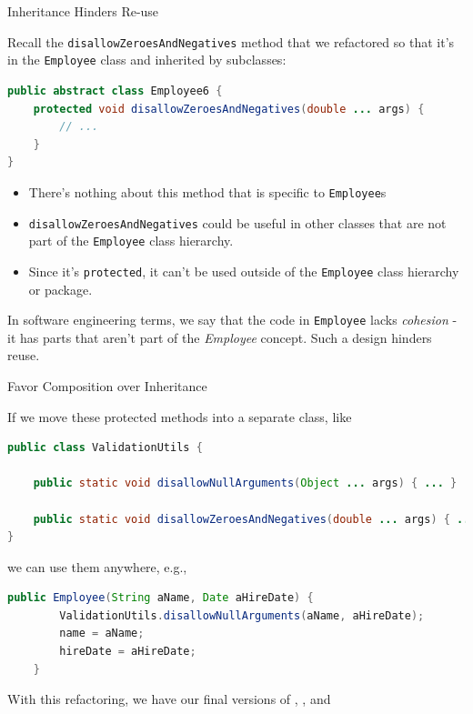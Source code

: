 \documentclass{beamer}
\begin{document}
\begin{frame}[fragile]{Inheritance Hinders Re-use}

Recall the {\tt disallowZeroesAndNegatives} method that we refactored so that it's in the {\tt Employee} class and inherited by subclasses:
\vspace{-.05in}
\begin{lstlisting}[language=Java]
public abstract class Employee6 {
    protected void disallowZeroesAndNegatives(double ... args) {
        // ...
    }
}
\end{lstlisting}

\begin{itemize}
\item There's nothing about this method that is specific to {\tt Employee}s
\item {\tt disallowZeroesAndNegatives} could be useful in other classes that are not part of the {\tt Employee} class hierarchy.
\item Since it's {\tt protected}, it can't be used outside of the {\tt Employee} class hierarchy or package. 
\end{itemize}

In software engineering terms, we say that the code in {\tt Employee} lacks {\it cohesion} - it has parts that aren't part of the {\it Employee} concept.  Such a design hinders reuse.

\end{frame}

\begin{frame}[fragile]{Favor Composition over Inheritance}

If we move these protected methods into a separate class, like 
\begin{lstlisting}[language=Java]
public class ValidationUtils {

    public static void disallowNullArguments(Object ... args) { ... }

    public static void disallowZeroesAndNegatives(double ... args) { ... }
}
\end{lstlisting}
we can use them anywhere, e.g., 
\begin{lstlisting}[language=Java]
    public Employee(String aName, Date aHireDate) {
        ValidationUtils.disallowNullArguments(aName, aHireDate);
        name = aName;
        hireDate = aHireDate;
    }
\end{lstlisting}
With this refactoring, we have our final versions of ,
, and

\end{frame}
\end{document}
